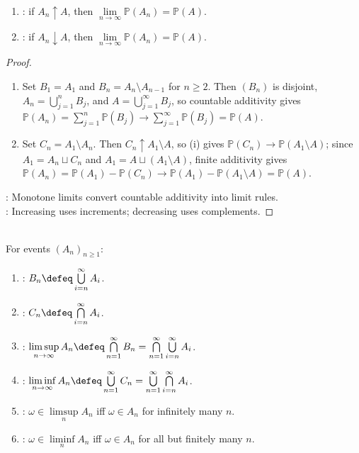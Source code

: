 \begin{theorem} \label{thm:probability-continuity-monotone-events} 
\begin{enumerate}[label=(\roman*)]
\setlength{\itemsep}{0pt}
\item {}: if $A_n\uparrow A$, then $\lim\limits_{n\to\infty}\mathbb{P}(A_n)=\mathbb{P}(A)$.
\item {}: if $A_n\downarrow A$, then $\lim\limits_{n\to\infty}\mathbb{P}(A_n)=\mathbb{P}(A)$.
\end{enumerate}
\begin{proof}
\begin{enumerate}[label=(\roman*)]
\setlength{\itemsep}{0pt}
\item Set $B_1=A_1$ and $B_n=A_n\setminus A_{n-1}$ for $n\geq2$. Then $(B_n)$ is disjoint, $A_n=\bigcup\limits_{j=1}^{n}B_j$, and $A=\bigcup\limits_{j=1}^{\infty}B_j$, so countable additivity gives $\mathbb{P}(A_n)=\sum\limits_{j=1}^{n}\mathbb{P}(B_j)\to\sum\limits_{j=1}^{\infty}\mathbb{P}(B_j)=\mathbb{P}(A)$.
\item Set $C_n=A_1\setminus A_n$. Then $C_n\uparrow A_1\setminus A$, so (i) gives $\mathbb{P}(C_n)\to\mathbb{P}(A_1\setminus A)$; since $A_1=A_n\sqcup C_n$ and $A_1=A\sqcup(A_1\setminus A)$, finite additivity gives $\mathbb{P}(A_n)=\mathbb{P}(A_1)-\mathbb{P}(C_n)\to\mathbb{P}(A_1)-\mathbb{P}(A_1\setminus A)=\mathbb{P}(A)$.
\end{enumerate}
: Monotone limits convert countable additivity into limit rules.\\
: Increasing uses increments; decreasing uses complements.
\end{proof}
\end{theorem}

\begin{definition} \label{def:limsup-liminf-events} \\
For events $(A_n)_{n\geq1}$:
\begin{enumerate}[label=(\roman*)]
\setlength{\itemsep}{0pt}
\item {}: $B_n\defeq\bigcup\limits_{i=n}^{\infty}A_i$.
\item {}: $C_n\defeq\bigcap\limits_{i=n}^{\infty}A_i$.
\item {}: $\limsup\limits_{n\to\infty}A_n\defeq\bigcap\limits_{n=1}^{\infty}B_n=\bigcap\limits_{n=1}^{\infty}\bigcup\limits_{i=n}^{\infty}A_i$.
\item {}: $\liminf\limits_{n\to\infty}A_n\defeq\bigcup\limits_{n=1}^{\infty}C_n=\bigcup\limits_{n=1}^{\infty}\bigcap\limits_{i=n}^{\infty}A_i$.
\item {}: $\omega\in\limsup\limits_nA_n$ iff $\omega\in A_n$ for infinitely many $n$.
\item {}: $\omega\in\liminf\limits_nA_n$ iff $\omega\in A_n$ for all but finitely many $n$.
\end{enumerate}
\end{definition}

